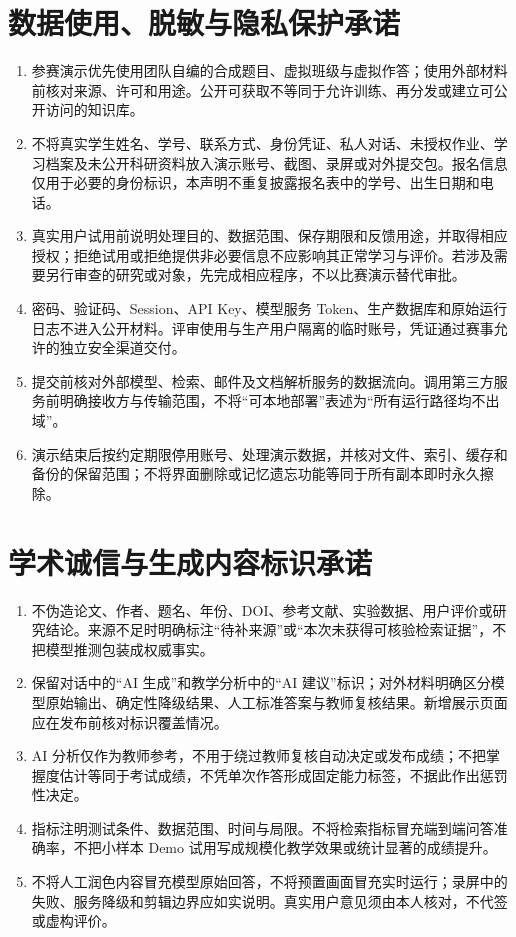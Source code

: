 \documentclass[UTF8,a4paper,zihao=-4,fontset=fandol]{ctexart}
\begin{document}
\section{数据使用、脱敏与隐私保护承诺}
\begin{enumerate}
  \item 参赛演示优先使用团队自编的合成题目、虚拟班级与虚拟作答；使用外部材料前核对来源、许可和用途。公开可获取不等同于允许训练、再分发或建立可公开访问的知识库。
  \item 不将真实学生姓名、学号、联系方式、身份凭证、私人对话、未授权作业、学习档案及未公开科研资料放入演示账号、截图、录屏或对外提交包。报名信息仅用于必要的身份标识，本声明不重复披露报名表中的学号、出生日期和电话。
  \item 真实用户试用前说明处理目的、数据范围、保存期限和反馈用途，并取得相应授权；拒绝试用或拒绝提供非必要信息不应影响其正常学习与评价。若涉及需要另行审查的研究或对象，先完成相应程序，不以比赛演示替代审批。
  \item 密码、验证码、Session、API Key、模型服务 Token、生产数据库和原始运行日志不进入公开材料。评审使用与生产用户隔离的临时账号，凭证通过赛事允许的独立安全渠道交付。
  \item 提交前核对外部模型、检索、邮件及文档解析服务的数据流向。调用第三方服务前明确接收方与传输范围，不将“可本地部署”表述为“所有运行路径均不出域”。
  \item 演示结束后按约定期限停用账号、处理演示数据，并核对文件、索引、缓存和备份的保留范围；不将界面删除或记忆遗忘功能等同于所有副本即时永久擦除。
\end{enumerate}

\section{学术诚信与生成内容标识承诺}
\begin{enumerate}
  \item 不伪造论文、作者、题名、年份、DOI、参考文献、实验数据、用户评价或研究结论。来源不足时明确标注“待补来源”或“本次未获得可核验检索证据”，不把模型推测包装成权威事实。
  \item 保留对话中的“AI 生成”和教学分析中的“AI 建议”标识；对外材料明确区分模型原始输出、确定性降级结果、人工标准答案与教师复核结果。新增展示页面应在发布前核对标识覆盖情况。
  \item AI 分析仅作为教师参考，不用于绕过教师复核自动决定或发布成绩；不把掌握度估计等同于考试成绩，不凭单次作答形成固定能力标签，不据此作出惩罚性决定。
  \item 指标注明测试条件、数据范围、时间与局限。不将检索指标冒充端到端问答准确率，不把小样本 Demo 试用写成规模化教学效果或统计显著的成绩提升。
  \item 不将人工润色内容冒充模型原始回答，不将预置画面冒充实时运行；录屏中的失败、服务降级和剪辑边界应如实说明。真实用户意见须由本人核对，不代签或虚构评价。
\end{enumerate}
\end{document}
